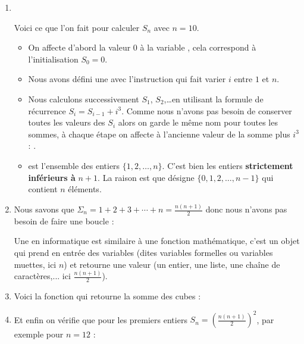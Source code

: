 \documentclass[class=report,crop=false]{standalone}
\begin{document}
\begin{enumerate}
  \item ~ 

Voici ce que l'on fait pour calculer $S_n$ avec $n = 10$.
\begin{itemize}
  \item On affecte d'abord la valeur $0$ à la variable , cela correspond à l'initialisation $S_0=0$.
  \item Nous avons défini une 
avec l'instruction  qui fait varier $i$ entre $1$ et $n$.
  \item Nous calculons successivement $S_1$, $S_2$,\ldots en utilisant la formule de récurrence
$S_{i}= S_{i-1}+i^3$. Comme nous n'avons pas besoin de conserver toutes les valeurs des $S_i$ alors on garde
le même nom pour toutes les sommes, à chaque étape on affecte à  l'ancienne valeur de la somme plus $i^3$ :
.
  \item {} est l'ensemble des entiers $\{1,2,\ldots,n\}$. C'est bien les entiers \textbf{strictement inférieurs à} $n+1$.
  La raison est que  désigne $\{0,1,2,\ldots,n-1\}$ qui contient $n$ éléments.
\end{itemize}

  \item Nous savons que $\Sigma_n = 1+2+3+\cdots+n=\frac{n(n+1)}{2}$ donc nous n'avons pas besoin de faire une boucle :


Une  en informatique est similaire à une fonction mathématique,
c'est un objet qui prend en entrée des variables (dites variables formelles ou variables muettes, ici $n$)
et retourne une valeur (un entier, une liste, une chaîne de caractères,... ici $\frac{n(n+1)}{2}$).

  \item Voici la fonction qui retourne la somme des cubes :


  \item Et enfin on vérifie que pour les premiers entiers $S_n = \left( \frac{n(n+1)}{2} \right)^2$,
  par exemple pour $n=12$ :

\end{enumerate}
\end{document}
